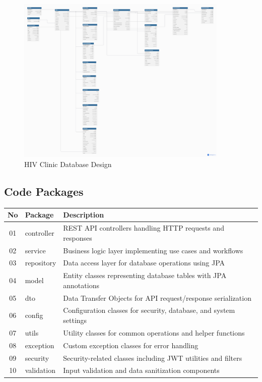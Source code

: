 \documentclass[12pt,a4paper]{article}
\begin{document}
\begin{figure}[H]
\centering
\includegraphics[width=0.9\textwidth]{diagrams/Picture/Database.png}
\caption{HIV Clinic Database Design}
\label{fig:database-design}
\end{figure}

\subsection{Code Packages}

\begin{longtable}{|c|p{4cm}|p{8cm}|}
\hline
\textbf{No} & \textbf{Package} & \textbf{Description} \\
\hline
01 & controller & REST API controllers handling HTTP requests and responses \\
\hline
02 & service & Business logic layer implementing use cases and workflows \\
\hline
03 & repository & Data access layer for database operations using JPA \\
\hline
04 & model & Entity classes representing database tables with JPA annotations \\
\hline
05 & dto & Data Transfer Objects for API request/response serialization \\
\hline
06 & config & Configuration classes for security, database, and system settings \\
\hline
07 & utils & Utility classes for common operations and helper functions \\
\hline
08 & exception & Custom exception classes for error handling \\
\hline
09 & security & Security-related classes including JWT utilities and filters \\
\hline
10 & validation & Input validation and data sanitization components \\
\hline
\end{longtable}
\end{document}
